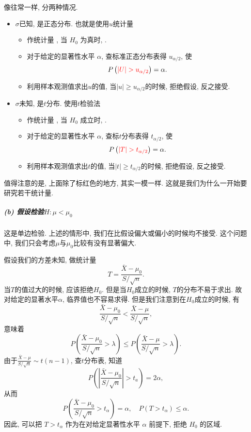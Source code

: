 像往常一样, 分两种情况. 
\begin{itemize}
    \item $\sigma$已知, 是正态分布. 也就是使用$u$统计量
    \begin{itemize}
        \item 作统计量 , 当 $H_0$ 为真时, .
        \item 对于给定的显著性水平 $\alpha$, 查标准正态分布表得 $u_{\alpha / 2}$, 使$$P\left(\red{|U|>u_{\alpha / 2}}\right)=\alpha .$$
        \item 利用样本观测值求出$u$的值, 当$|u|\geq u_{\alpha/2}$的时候, 拒绝假设, 反之接受. 
    \end{itemize}
    \item $\sigma$未知, 是$t$分布. 使用$t$检验法
    \begin{itemize}
        \item 作统计量 , 当 $H_0$ 成立时, .
        \item 对于给定的显著性水平 $\alpha$, 查标$t$分布表得 $t_{\alpha / 2}$, 使$$P\left(\red{|T|>t_{\alpha / 2}}\right)=\alpha .$$ 
        \item 利用样本观测值求出$t$的值, 当$|t|\geq t_{\alpha/2}$的时候, 拒绝假设, 反之接受. 
    \end{itemize}
\end{itemize}

值得注意的是, 上面除了标红色的地方, 其实一模一样. 这就是我们为什么一开始要研究若干统计量. 

\subparagraph{(b) 假设检验$H:\mu<\mu_0$} 这是单边检验. 上述的情形中, 我们在比假设偏大或偏小的时候均不接受. 这个问题中, 我们只会考虑$\mu$与$\mu_0$比较有没有显著偏大. 

假设我们的方差未知, 做统计量$$T=\frac{\bar{X}-\mu_0}{S / \sqrt{n}}.$$当$T$的值过大的时候, 应该拒绝$H_0$. 但是当$H_0$成立的时候, $T$的分布不易于求出. 故对给定的显著水平$\alpha$, 临界值也不容易求得. 但是我们注意到在$H_0$成立的时候, 有$$\frac{\bar{X}-\mu_0}{S / \sqrt{n}}<\frac{\bar{X}-\mu}{S / \sqrt{n}},$$意味着$$P\left(\frac{\bar{X}-\mu_0}{S / \sqrt{n}}>\lambda\right) \leqslant P\left(\frac{\bar{X}-\mu}{S / \sqrt{n}}>\lambda\right).$$ 由于$\frac{\bar{X}-\mu}{S / \sqrt{n}} \sim t(n-1)$, 查$t$分布表, 知道$$P\left(\left|\frac{\bar{X}-\mu_0}{S / \sqrt{n}}\right|>t_a\right)=2 \alpha,$$从而$$P\left(\frac{\bar{X}-\mu_0}{S / \sqrt{n}}>t_\alpha\right)=\alpha, \quad P\left(T>t_\alpha\right) \leqslant \alpha.$$因此, 可以把 $T>t_\alpha$ 作为在对给定显著性水平 $\alpha$ 前提下, 拒绝 $H_0$ 的区域.

